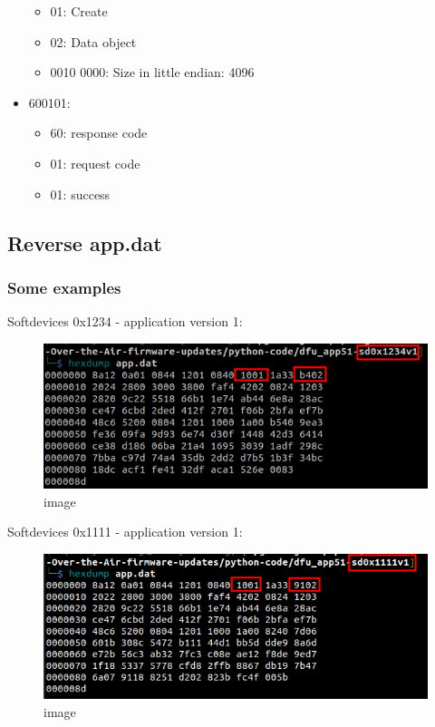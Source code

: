 \begin{itemize}
  \begin{itemize}
  \tightlist
  \item
    01: Create
  \item
    02: Data object
  \item
    0010 0000: Size in little endian: 4096
  \end{itemize}
\item
  600101:

  \begin{itemize}
  \tightlist
  \item
    60: response code
  \item
    01: request code
  \item
    01: success
  \end{itemize}
\end{itemize}

\hypertarget{reverse-app.dat}{%
\subsection{Reverse app.dat}\label{reverse-app.dat}}

\hypertarget{some-examples}{%
\subsubsection{Some examples}\label{some-examples}}

Softdevices 0x1234 - application version 1:

\begin{figure}
\centering
\includegraphics{images/readme/screenshot_21-05-2023_20h36m31.png}
\caption{image}
\end{figure}

Softdevices 0x1111 - application version 1:

\begin{figure}
\centering
\includegraphics{images/readme/screenshot_21-05-2023_20h37m28.png}
\caption{image}
\end{figure}

